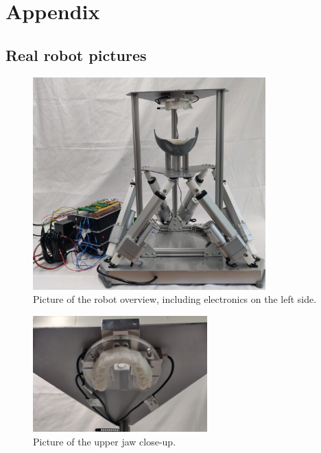 \section{Appendix}

\subsection{Real robot pictures}
\label{sec:real_pictures}
\begin{figure}[H]
    \centering
    \includegraphics[width=0.8\textwidth]{figures/overview_real.jpg}
    \caption{Picture of the robot overview, including electronics on the left side.}
    \label{fig:overview_real}
\end{figure}

\begin{figure}[H]
    \centering
    \includegraphics[width=0.6\textwidth]{figures/upper_jaw_close_up.jpg}
    \caption{Picture of the upper jaw close-up.}
    \label{fig:pic_upper_jaw_close_up}
\end{figure}

